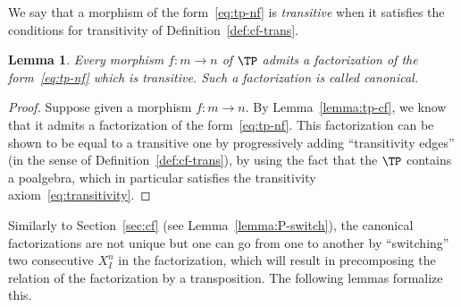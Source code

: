 \documentclass[submission,copyright,creativecommons]{eptcs}
\newtheorem{lemma}[theorem]{Lemma}
\theoremstyle{definition}
\theoremstyle{remark}
\begin{document}
\noindent
We say that a morphism of the form~\eqref{eq:tp-nf} is \emph{transitive} when it
satisfies the conditions for transitivity of Definition~\ref{def:cf-trans}.

\begin{lemma}
  \label{lemma:TP-trans-fact}
  Every morphism $f:m\to n$ of $\TP$ admits a factorization of the
  form~\eqref{eq:tp-nf} which is transitive. Such a factorization is called
  \emph{canonical}.
\end{lemma}
\begin{proof}
  Suppose given a morphism $f:m\to n$. By Lemma~\ref{lemma:tp-cf}, we know that
  it admits a factorization of the form~\eqref{eq:tp-nf}. This factorization can
  be shown to be equal to a transitive one by progressively adding
  ``transitivity edges'' (in the sense of Definition~\ref{def:cf-trans}), by
  using the fact that the $\TP$ contains a poalgebra, which in particular
  satisfies the transitivity axiom~\eqref{eq:transitivity}.
\end{proof}



\noindent
Similarly to Section~\ref{sec:cf} (see Lemma~\ref{lemma:P-switch}), the
canonical factorizations are not unique but one can go from one to another by
``switching'' two consecutive $X^n_I$ in the factorization, which will result in
precomposing the relation of the factorization by a transposition. The following
lemmas formalize this.
\end{document}

